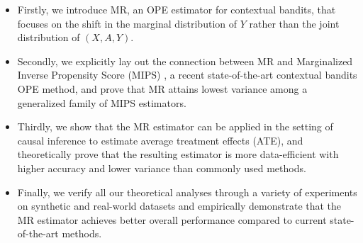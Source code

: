 \begin{itemize}
    \item Firstly, we introduce MR, an OPE estimator for contextual bandits, that focuses on the shift in the marginal distribution of $Y$ rather than the joint distribution of $(X, A, Y)$. 
    
    \item Secondly, we explicitly lay out the connection between MR and  Marginalized Inverse Propensity Score (MIPS) \citep{saito2022off}, a recent state-of-the-art contextual bandits OPE method, and prove that MR attains lowest variance among a generalized family of MIPS estimators. 
    \item Thirdly, we show that the MR estimator can be applied in the setting of causal inference to estimate average treatment effects (ATE), and theoretically prove that the resulting estimator is more data-efficient with higher accuracy and lower variance than commonly used methods. 
    \item Finally, we verify all our theoretical analyses through a variety of experiments on synthetic and real-world datasets and empirically demonstrate that the MR estimator achieves better overall performance compared to current state-of-the-art methods. 
\end{itemize}

